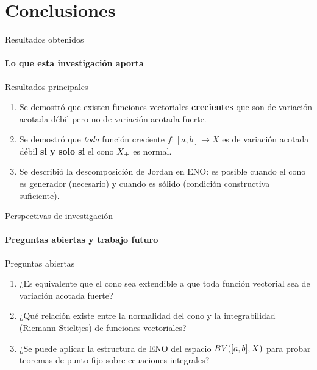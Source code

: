 \section{Conclusiones}

\begin{frame}{Resultados obtenidos}
\framesubtitle{Lo que esta investigación aporta}

\begin{block}{Resultados principales}
\begin{enumerate}
  \item Se demostró que existen funciones vectoriales \textbf{crecientes} que
        son de variación acotada débil pero no de variación acotada fuerte.

  \item Se demostró que \emph{toda} función creciente $f:[a,b]\to X$
        es de variación acotada débil \textbf{si y solo si} el cono $X_{+}$
        es normal.

  \item Se describió la descomposición de Jordan en ENO: es posible
        cuando el cono es generador (necesario) y cuando es sólido
        (condición constructiva suficiente).
\end{enumerate}
\end{block}

\end{frame}


\begin{frame}{Perspectivas de investigación}
\framesubtitle{Preguntas abiertas y trabajo futuro}

\begin{block}{Preguntas abiertas}
\begin{enumerate}
  \item ¿Es equivalente que el cono sea extendible a que toda
        función vectorial sea de variación acotada fuerte?

  \item ¿Qué relación existe entre la normalidad del cono y la
        integrabilidad (Riemann-Stieltjes) de funciones vectoriales?

  \item ¿Se puede aplicar la estructura de ENO del espacio $BV([a,b],X)$
        para probar teoremas de punto fijo sobre ecuaciones integrales?
\end{enumerate}
\end{block}


\end{frame}
